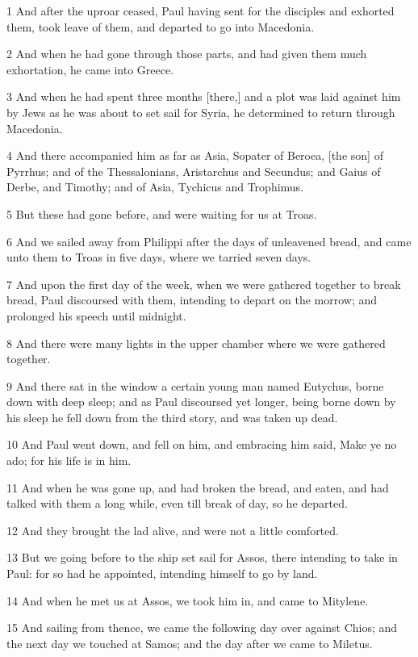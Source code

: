 \par 1 And after the uproar ceased, Paul having sent for the disciples and exhorted them, took leave of them, and departed to go into Macedonia.
\par 2 And when he had gone through those parts, and had given them much exhortation, he came into Greece.
\par 3 And when he had spent three months [there,] and a plot was laid against him by Jews as he was about to set sail for Syria, he determined to return through Macedonia.
\par 4 And there accompanied him as far as Asia, Sopater of Beroea, [the son] of Pyrrhus; and of the Thessalonians, Aristarchus and Secundus; and Gaius of Derbe, and Timothy; and of Asia, Tychicus and Trophimus.
\par 5 But these had gone before, and were waiting for us at Troas.
\par 6 And we sailed away from Philippi after the days of unleavened bread, and came unto them to Troas in five days, where we tarried seven days.
\par 7 And upon the first day of the week, when we were gathered together to break bread, Paul discoursed with them, intending to depart on the morrow; and prolonged his speech until midnight.
\par 8 And there were many lights in the upper chamber where we were gathered together.
\par 9 And there sat in the window a certain young man named Eutychus, borne down with deep sleep; and as Paul discoursed yet longer, being borne down by his sleep he fell down from the third story, and was taken up dead.
\par 10 And Paul went down, and fell on him, and embracing him said, Make ye no ado; for his life is in him.
\par 11 And when he was gone up, and had broken the bread, and eaten, and had talked with them a long while, even till break of day, so he departed.
\par 12 And they brought the lad alive, and were not a little comforted.
\par 13 But we going before to the ship set sail for Assos, there intending to take in Paul: for so had he appointed, intending himself to go by land.
\par 14 And when he met us at Assos, we took him in, and came to Mitylene.
\par 15 And sailing from thence, we came the following day over against Chios; and the next day we touched at Samos; and the day after we came to Miletus.
